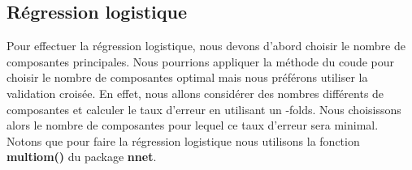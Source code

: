\documentclass[12pt,a4paper]{article}
\begin{document}
\subsection{Régression logistique} 
Pour effectuer la régression logistique, nous devons d'abord choisir le nombre
de composantes principales. Nous pourrions appliquer la méthode du \og coude
\fg pour choisir le nombre de composantes optimal mais nous préférons utiliser
la validation croisée. En effet, nous allons considérer des nombres différents
de composantes et calculer le taux d'erreur en utilisant un -folds\fg.
Nous choisissons alors le nombre de composantes pour lequel ce taux d'erreur
sera minimal.\\
Notons que pour faire la régression logistique nous utilisons la fonction
\textbf{multiom()} du package \textbf{nnet}.\vspace{2mm}
\end{document}
